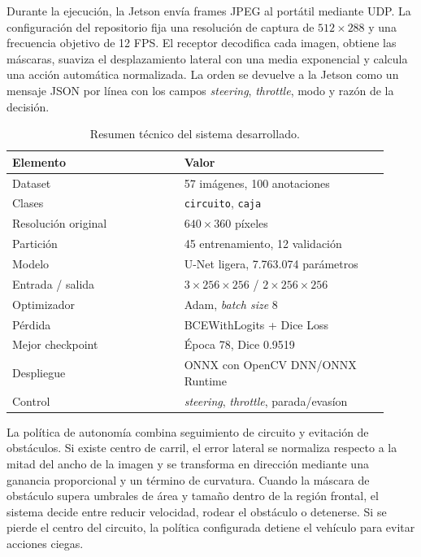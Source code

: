 \documentclass[conference,a4paper]{IEEEtran}
\begin{document}
Durante la ejecuci\'on, la Jetson env\'ia frames JPEG al port\'atil mediante UDP. La configuraci\'on del repositorio fija una resoluci\'on de captura de $512 \times 288$ y una frecuencia objetivo de 12 FPS. El receptor decodifica cada imagen, obtiene las m\'ascaras, suaviza el desplazamiento lateral con una media exponencial y calcula una acci\'on autom\'atica normalizada. La orden se devuelve a la Jetson como un mensaje JSON por l\'inea con los campos \textit{steering}, \textit{throttle}, modo y raz\'on de la decisi\'on.

\begin{table}[t]
\centering
\caption{Resumen t\'ecnico del sistema desarrollado.}
\label{tab:resumen}
\footnotesize
\begin{tabular}{@{}p{0.42\linewidth}p{0.50\linewidth}@{}}
\toprule
\textbf{Elemento} & \textbf{Valor} \\
\midrule
Dataset & 57 im\'agenes, 100 anotaciones \\
Clases & \texttt{circuito}, \texttt{caja} \\
Resoluci\'on original & $640 \times 360$ p\'ixeles \\
Partici\'on & 45 entrenamiento, 12 validaci\'on \\
Modelo & U-Net ligera, 7.763.074 par\'ametros \\
Entrada / salida & $3 \times 256 \times 256$ / $2 \times 256 \times 256$ \\
Optimizador & Adam, \textit{batch size} 8 \\
P\'erdida & BCEWithLogits + Dice Loss \\
Mejor checkpoint & \'Epoca 78, Dice 0.9519 \\
Despliegue & ONNX con OpenCV DNN/ONNX Runtime \\
Control & \textit{steering}, \textit{throttle}, parada/evas\'ion \\
\bottomrule
\end{tabular}
\end{table}

La pol\'itica de autonom\'ia combina seguimiento de circuito y evitaci\'on de obst\'aculos. Si existe centro de carril, el error lateral se normaliza respecto a la mitad del ancho de la imagen y se transforma en direcci\'on mediante una ganancia proporcional y un t\'ermino de curvatura. Cuando la m\'ascara de obst\'aculo supera umbrales de \'area y tama\~no dentro de la regi\'on frontal, el sistema decide entre reducir velocidad, rodear el obst\'aculo o detenerse. Si se pierde el centro del circuito, la pol\'itica configurada detiene el veh\'iculo para evitar acciones ciegas.
\end{document}
